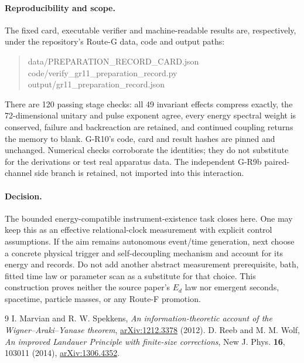 \documentclass[11pt,a4paper]{article}
\begin{document}
\paragraph{Reproducibility and scope.}
The fixed card, executable verifier and machine-readable results are,
respectively, under the repository's Route-G data, code and output paths:
\begin{quote}\small\ttfamily
data/PREPARATION\_RECORD\_CARD.json\\
code/verify\_gr11\_preparation\_record.py\\
output/gr11\_preparation\_record.json
\end{quote}
There are 120 passing stage checks: all 49 invariant effects compress
exactly, the 72-dimensional unitary and pulse exponent agree, every
energy spectral weight is conserved, failure and backreaction are
retained, and continued coupling returns the memory to blank. G-R10's
code, card and result hashes are pinned and unchanged. Numerical checks
corroborate the identities; they do not substitute for the derivations
or test real apparatus data. The independent G-R9b paired-channel side
branch is retained, not imported into this interaction.

\paragraph{Decision.}
The bounded energy-compatible instrument-existence task closes here.
One may keep this as an effective relational-clock measurement with
explicit control assumptions. If the aim remains autonomous event/time
generation, next choose a concrete physical trigger and self-decoupling
mechanism and account for its energy and records. Do not add another
abstract measurement prerequisite, bath, fitted time law or parameter
scan as a substitute for that choice. This construction proves neither
the source paper's $E_d$ law nor emergent seconds, spacetime, particle
masses, or any Route-F promotion.

\begin{thebibliography}{9}\small
{} I. Marvian and R. W. Spekkens,
\emph{An information-theoretic account of the Wigner--Araki--Yanase theorem},
\href{https://arxiv.org/abs/1212.3378}{arXiv:1212.3378} (2012).
 D. Reeb and M. M. Wolf,
\emph{An improved Landauer Principle with finite-size corrections},
New J. Phys. \textbf{16}, 103011 (2014),
\href{https://arxiv.org/abs/1306.4352}{arXiv:1306.4352}.
\end{thebibliography}
\end{document}
